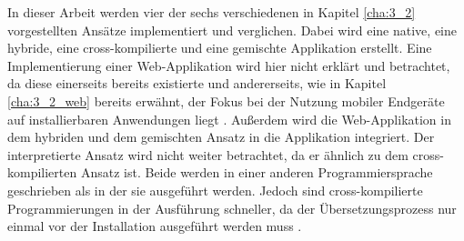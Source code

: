 In dieser Arbeit werden vier der sechs verschiedenen in Kapitel \ref{cha:3_2} vorgestellten Ansätze implementiert und verglichen. Dabei wird eine native, eine hybride, eine cross-kompilierte und eine gemischte Applikation erstellt. Eine Implementierung einer Web-Applikation wird hier nicht erklärt und betrachtet, da diese einerseits bereits existierte und andererseits, wie in Kapitel \ref{cha:3_2_web} bereits erwähnt, der Fokus bei der Nutzung mobiler Endgeräte auf installierbaren Anwendungen liegt \cite{report_webusage}. Außerdem wird die Web-Applikation in dem hybriden und dem gemischten Ansatz in die Applikation integriert. Der interpretierte Ansatz wird nicht weiter betrachtet, da er ähnlich zu dem cross-kompilierten Ansatz ist. Beide werden in einer anderen Programmiersprache geschrieben als in der sie ausgeführt werden. Jedoch sind cross-kompilierte Programmierungen in der Ausführung schneller, da der Übersetzungsprozess nur einmal vor der Installation ausgeführt werden muss \cite{interpreted_vs_compiled}.
